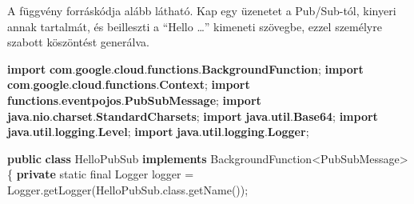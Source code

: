 \documentclass[
]{article}
\newenvironment{Shaded}{}{}
\newcommand{\BuiltInTok}[1]{\textcolor[rgb]{0.00,0.50,0.00}{#1}}
\newcommand{\DataTypeTok}[1]{\textcolor[rgb]{0.56,0.13,0.00}{#1}}
\newcommand{\FunctionTok}[1]{\textcolor[rgb]{0.02,0.16,0.49}{#1}}
\newcommand{\ImportTok}[1]{\textcolor[rgb]{0.00,0.50,0.00}{\textbf{#1}}}
\newcommand{\KeywordTok}[1]{\textcolor[rgb]{0.00,0.44,0.13}{\textbf{#1}}}
\newcommand{\NormalTok}[1]{#1}
\newcommand{\OperatorTok}[1]{\textcolor[rgb]{0.40,0.40,0.40}{#1}}
\begin{document}
A függvény forráskódja alább látható. Kap egy üzenetet a Pub/Sub-tól,
kinyeri annak tartalmát, és beilleszti a ``Hello \ldots{}'' kimeneti
szövegbe, ezzel személyre szabott köszöntést generálva.

\begin{Shaded}
\begin{Highlighting}[]
\KeywordTok{import} \ImportTok{com}\OperatorTok{.}\ImportTok{google}\OperatorTok{.}\ImportTok{cloud}\OperatorTok{.}\ImportTok{functions}\OperatorTok{.}\ImportTok{BackgroundFunction}\OperatorTok{;}
\KeywordTok{import} \ImportTok{com}\OperatorTok{.}\ImportTok{google}\OperatorTok{.}\ImportTok{cloud}\OperatorTok{.}\ImportTok{functions}\OperatorTok{.}\ImportTok{Context}\OperatorTok{;}
\KeywordTok{import} \ImportTok{functions}\OperatorTok{.}\ImportTok{eventpojos}\OperatorTok{.}\ImportTok{PubSubMessage}\OperatorTok{;}
\KeywordTok{import} \ImportTok{java}\OperatorTok{.}\ImportTok{nio}\OperatorTok{.}\ImportTok{charset}\OperatorTok{.}\ImportTok{StandardCharsets}\OperatorTok{;}
\KeywordTok{import} \ImportTok{java}\OperatorTok{.}\ImportTok{util}\OperatorTok{.}\ImportTok{Base64}\OperatorTok{;}
\KeywordTok{import} \ImportTok{java}\OperatorTok{.}\ImportTok{util}\OperatorTok{.}\ImportTok{logging}\OperatorTok{.}\ImportTok{Level}\OperatorTok{;}
\KeywordTok{import} \ImportTok{java}\OperatorTok{.}\ImportTok{util}\OperatorTok{.}\ImportTok{logging}\OperatorTok{.}\ImportTok{Logger}\OperatorTok{;}

\KeywordTok{public} \KeywordTok{class}\NormalTok{ HelloPubSub }\KeywordTok{implements}\NormalTok{ BackgroundFunction}\OperatorTok{\textless{}}\NormalTok{PubSubMessage}\OperatorTok{\textgreater{}} \OperatorTok{\{}
  \KeywordTok{private} \DataTypeTok{static} \DataTypeTok{final} \BuiltInTok{Logger}\NormalTok{ logger }\OperatorTok{=} \BuiltInTok{Logger}\OperatorTok{.}\FunctionTok{getLogger}\OperatorTok{(}\NormalTok{HelloPubSub}\OperatorTok{.}\FunctionTok{class}\OperatorTok{.}\FunctionTok{getName}\OperatorTok{());}


\end{Highlighting}
\end{Shaded}
\end{document}
